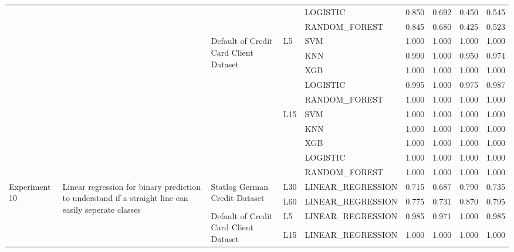 \begin{table}
\begin{tabular}{lllllrrrr}
 &  &  &  & LOGISTIC & 0.850 & 0.692 & 0.450 & 0.545 \\
 &  &  &  & RANDOM\_FOREST & 0.845 & 0.680 & 0.425 & 0.523 \\
\cline{3-9} \cline{4-9}
 &  & \multirow[t]{10}{*}{Default of Credit Card Client Dataset} & \multirow[t]{5}{*}{L5} & SVM & 1.000 & 1.000 & 1.000 & 1.000 \\
 &  &  &  & KNN & 0.990 & 1.000 & 0.950 & 0.974 \\
 &  &  &  & XGB & 1.000 & 1.000 & 1.000 & 1.000 \\
 &  &  &  & LOGISTIC & 0.995 & 1.000 & 0.975 & 0.987 \\
 &  &  &  & RANDOM\_FOREST & 1.000 & 1.000 & 1.000 & 1.000 \\
\cline{4-9}
 &  &  & \multirow[t]{5}{*}{L15} & SVM & 1.000 & 1.000 & 1.000 & 1.000 \\
 &  &  &  & KNN & 1.000 & 1.000 & 1.000 & 1.000 \\
 &  &  &  & XGB & 1.000 & 1.000 & 1.000 & 1.000 \\
 &  &  &  & LOGISTIC & 1.000 & 1.000 & 1.000 & 1.000 \\
 &  &  &  & RANDOM\_FOREST & 1.000 & 1.000 & 1.000 & 1.000 \\
\cline{1-9} \cline{2-9} \cline{3-9} \cline{4-9}
\multirow[t]{4}{*}{Experiment 10} & \multirow[t]{4}{*}{Linear regression for binary prediction to understand if a straight line can easily seperate classes} & \multirow[t]{2}{*}{Statlog German Credit Dataset} & L30 & LINEAR\_REGRESSION & 0.715 & 0.687 & 0.790 & 0.735 \\
\cline{4-9}
 &  &  & L60 & LINEAR\_REGRESSION & 0.775 & 0.731 & 0.870 & 0.795 \\
\cline{3-9} \cline{4-9}
 &  & \multirow[t]{2}{*}{Default of Credit Card Client Dataset} & L5 & LINEAR\_REGRESSION & 0.985 & 0.971 & 1.000 & 0.985 \\
\cline{4-9}
 &  &  & L15 & LINEAR\_REGRESSION & 1.000 & 1.000 & 1.000 & 1.000 \\
\cline{1-9} \cline{2-9} \cline{3-9} \cline{4-9}
\bottomrule
\end{tabular}
\end{table}
